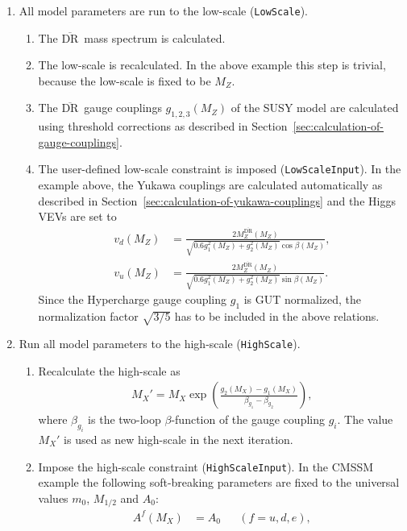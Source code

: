 \documentclass[final,3p,11pt,pdflatex]{elsarticle}
\newcommand{\code}[1]{\lstinline|#1|}  %
\newcommand{\textoverline}[1]{$\overline{\mbox{#1}}$}
\newcommand{\DRbar}{\textoverline{DR}\xspace}
\newcommand{\secref}[1]{Section~\ref{#1}}
\begin{document}
\begin{enumerate}
\item \label{rge-step-one} All model parameters are run to the
  low-scale (\code{LowScale}).
  \begin{enumerate}
  \item The \DRbar\ mass spectrum is calculated.
  \item The low-scale is recalculated.  In the above example this step
    is trivial, because the low-scale is fixed to be $M_Z$.
  \item The \DRbar\ gauge couplings $g_{1,2,3}(M_Z)$ of the SUSY model
    are calculated using threshold corrections as described in
    \secref{sec:calculation-of-gauge-couplings}.
  \item The user-defined low-scale constraint is imposed
    (\code{LowScaleInput}).  In the example above, the Yukawa
    couplings are calculated automatically as described in
    \secref{sec:calculation-of-yukawa-couplings} and the Higgs VEVs
    are set to
    \begin{align}
      v_d(M_Z) &= \frac{2 M_Z^\text{\DRbar}(M_Z)}{\sqrt{0.6 g_1^2(M_Z) + g_2^2(M_Z)} \cos\beta(M_Z)}, \\
      v_u(M_Z) &= \frac{2 M_Z^\text{\DRbar}(M_Z)}{\sqrt{0.6 g_1^2(M_Z) + g_2^2(M_Z)} \sin\beta(M_Z)}.
    \end{align}
    Since the Hypercharge gauge coupling $g_1$ is GUT normalized, the
    normalization factor $\sqrt{3/5}$ has to be included in the above
    relations.
  \end{enumerate}
\item Run all model parameters to the high-scale (\code{HighScale}).
  \begin{enumerate}
  \item Recalculate the high-scale as
    \begin{align}
      M_X' = M_X \exp\left(\frac{g_2(M_X)-g_1(M_X)}{\beta_{g_1} -
          \beta_{g_2}}\right),
    \end{align}
    where $\beta_{g_i}$ is the two-loop $\beta$-function of the gauge
    coupling $g_i$.  The value $M_X'$ is used as new high-scale in the
    next iteration.
  \item Impose the high-scale constraint (\code{HighScaleInput}).  In
    the CMSSM example the following soft-breaking parameters are fixed
    to the universal values $m_0$, $M_{1/2}$ and $A_0$:
    \begin{align}
      A^f(M_X) &= A_0 & &(f=u,d,e),\\

\end{align}
\end{enumerate}
\end{enumerate}
\end{document}
